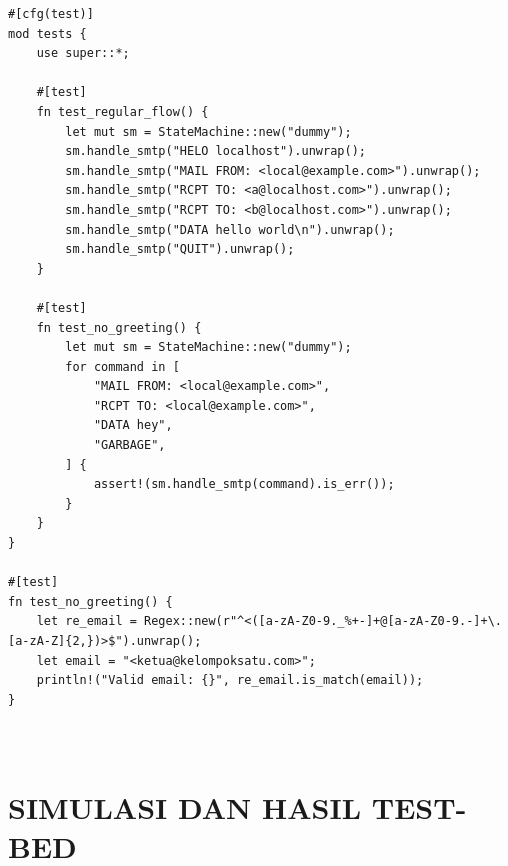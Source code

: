 \documentclass[12pt, a4paper]{article}
\begin{document}
\begin{enumerate}
\begin{verbatim}
#[cfg(test)]
mod tests {
    use super::*;

    #[test]
    fn test_regular_flow() {
        let mut sm = StateMachine::new("dummy");
        sm.handle_smtp("HELO localhost").unwrap();
        sm.handle_smtp("MAIL FROM: <local@example.com>").unwrap();
        sm.handle_smtp("RCPT TO: <a@localhost.com>").unwrap();
        sm.handle_smtp("RCPT TO: <b@localhost.com>").unwrap();
        sm.handle_smtp("DATA hello world\n").unwrap();
        sm.handle_smtp("QUIT").unwrap();
    }

    #[test]
    fn test_no_greeting() {
        let mut sm = StateMachine::new("dummy");
        for command in [
            "MAIL FROM: <local@example.com>",
            "RCPT TO: <local@example.com>",
            "DATA hey",
            "GARBAGE",
        ] {
            assert!(sm.handle_smtp(command).is_err());
        }
    }
}

#[test]
fn test_no_greeting() {
    let re_email = Regex::new(r"^<([a-zA-Z0-9._%+-]+@[a-zA-Z0-9.-]+\.[a-zA-Z]{2,})>$").unwrap();
    let email = "<ketua@kelompoksatu.com>";
    println!("Valid email: {}", re_email.is_match(email));
}

   \end{verbatim}
\end{enumerate}
\pagebreak

\section{\centering\\SIMULASI DAN HASIL TEST-BED}
\end{document}
